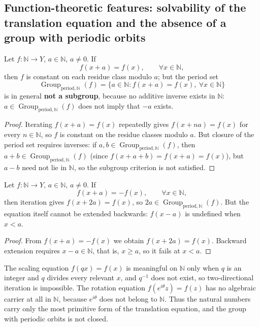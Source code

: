 \subsection{\texorpdfstring{Function-theoretic features: solvability of the translation equation and the absence of a group with periodic orbits}{Function-theoretic features: solvability of the translation equation and the absence of a group with periodic orbits}}

\begin{proposition}\label{prop:translation_equation_N}
Let $f:\mathbb{N}\to Y$, $a\in\mathbb{N}$, $a\ne0$. If
\[
f(x+a)=f(x),\qquad \forall x\in\mathbb{N},
\]
then $f$ is constant on each residue class modulo $a$; but the period set
\[
\operatorname{Group}_{\mathrm{period},\mathbb{N}}(f)=\{a\in\mathbb{N}: f(x+a)=f(x),\ \forall x\in\mathbb{N}\}
\]
is in general \textbf{not a subgroup}, because no additive inverse exists in $\mathbb{N}$: $a\in\operatorname{Group}_{\mathrm{period},\mathbb{N}}(f)$ does not imply that $-a$ exists.
\end{proposition}

\begin{proof}
Iterating $f(x+a)=f(x)$ repeatedly gives $f(x+na)=f(x)$ for every $n\in\mathbb{N}$, so $f$ is constant on the residue classes modulo $a$. But closure of the period set requires inverses: if $a,b\in\operatorname{Group}_{\mathrm{period},\mathbb{N}}(f)$, then $a+b\in\operatorname{Group}_{\mathrm{period},\mathbb{N}}(f)$ (since $f(x+a+b)=f(x+a)=f(x)$), but $a-b$ need not lie in $\mathbb{N}$, so the subgroup criterion is not satisfied.
\end{proof}

\begin{proposition}\label{prop:antiperiod_N}
Let $f:\mathbb{N}\to Y$, $a\in\mathbb{N}$, $a\ne0$. If
\[
f(x+a)=-f(x),\qquad \forall x\in\mathbb{N},
\]
then iteration gives $f(x+2a)=f(x)$, so $2a\in\operatorname{Group}_{\mathrm{period},\mathbb{N}}(f)$. But the equation itself cannot be extended backwards: $f(x-a)$ is undefined when $x<a$.
\end{proposition}

\begin{proof}
From $f(x+a)=-f(x)$ we obtain $f(x+2a)=f(x)$. Backward extension requires $x-a\in\mathbb{N}$, that is, $x\ge a$, so it fails at $x<a$.
\end{proof}

\begin{remark}\label{rem:scaling_rotation_N}
The scaling equation $f(qx)=f(x)$ is meaningful on $\mathbb{N}$ only when $q$ is an integer and $q$ divides every relevant $x$, and $q^{-1}$ does not exist, so two-directional iteration is impossible. The rotation equation $f(e^{i\theta}z)=f(z)$ has no algebraic carrier at all in $\mathbb{N}$, because $e^{i\theta}$ does not belong to $\mathbb{N}$. Thus the natural numbers carry only the most primitive form of the translation equation, and the group with periodic orbits is not closed.
\end{remark}

